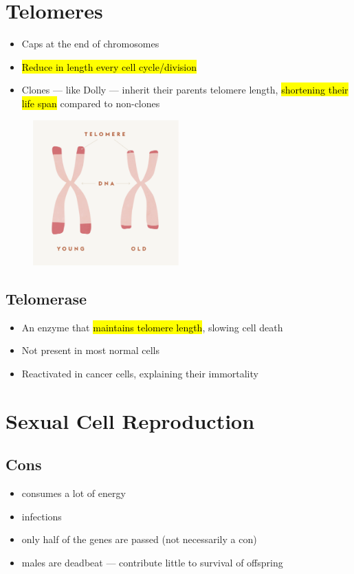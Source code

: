\documentclass[a4paper,12pt]{article}
\begin{document}
\section{Telomeres}
\begin{itemize}
    \item{Caps at the end of chromosomes}
    \item{\hl{Reduce in length every cell cycle/division}}
    \item{Clones --- like Dolly --- inherit their parents telomere length, \hl{shortening their life span} compared to non-clones} 
\end{itemize}

\begin{figure}[H]
    \centering
    \includegraphics[width=0.50\textwidth]{telomere}
\end{figure}

\subsection{Telomerase}
\begin{itemize}
    \item{An enzyme that \hl{maintains telomere length}, slowing cell death}
    \item{Not present in most normal cells}
    \item{Reactivated in cancer cells, explaining their immortality}
\end{itemize}

\section{Sexual Cell Reproduction}

\subsection{Cons}
\begin{itemize}
    \item{consumes a lot of energy}
    \item{infections}
    \item{only half of the genes are passed (not necessarily a con)}
    \item{males are deadbeat --- contribute little to survival of offspring}
\end{itemize}
\end{document}
